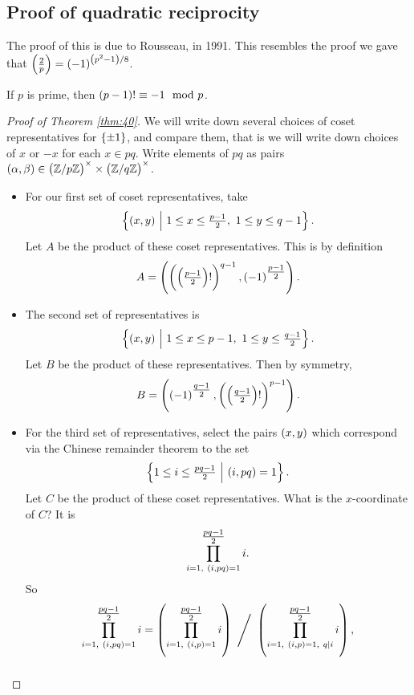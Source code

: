 \pagebreak

\subsection{Proof of quadratic reciprocity}


The proof of this is due to Rousseau, in 1991. This resembles the proof we gave that $ \jacobi{2}{p} = \br{-1}^{\br{p^2 - 1} / 8} $.

\begin{theorem}
If $ p $ is prime, then $ \br{p - 1}! \equiv -1 \mod p $.
\end{theorem}

\begin{proof}[Proof of Theorem \ref{thm:40}]
We will write down several choices of coset representatives for $ \cbr{\pm 1} $, and compare them, that is we will write down choices of $ x $ or $ -x $ for each $ x \in \unit{pq} $. Write elements of $ \unit{pq} $ as pairs $ \br{\alpha, \beta} \in \unit{p} \times \unit{q} $.
\begin{itemize}
\item For our first set of coset representatives, take
$$ \cbr{\br{x, y} \st 1 \le x \le \tfrac{p - 1}{2}, \ 1 \le y \le q - 1}. $$
Let $ A $ be the product of these coset representatives. This is by definition
$$ A = \br{\br{\br{\tfrac{p - 1}{2}}!}^{q - 1}, \br{-1}^{\tfrac{p - 1}{2}}}. $$
\item The second set of representatives is
$$ \cbr{\br{x, y} \st 1 \le x \le p - 1, \ 1 \le y \le \tfrac{q - 1}{2}}. $$
Let $ B $ be the product of these representatives. Then by symmetry,
$$ B = \br{\br{-1}^{\tfrac{q - 1}{2}}, \br{\br{\tfrac{q - 1}{2}}!}^{p - 1}}. $$
\item For the third set of representatives, select the pairs $ \br{x, y} $ which correspond via the Chinese remainder theorem to the set
$$ \cbr{1 \le i \le \tfrac{pq - 1}{2} \st \br{i, pq} = 1}. $$
Let $ C $ be the product of these coset representatives. What is the $ x $-coordinate of $ C $? It is
$$ \prod_{i = 1, \ \br{i, pq} = 1}^{\tfrac{pq - 1}{2}} i. $$
So
\begin{equation}
\label{eq:1}
\prod_{i = 1, \ \br{i, pq} = 1}^{\tfrac{pq - 1}{2}} i = \br{\prod_{i = 1, \ \br{i, p} = 1}^{\tfrac{pq - 1}{2}} i} \ \Bigg/ \ \br{\prod_{i = 1, \ \br{i, p} = 1, \ q \mid i}^{\tfrac{pq - 1}{2}} i},
\end{equation}
\begin{equation}

\end{equation}
\end{itemize}
\end{proof}
